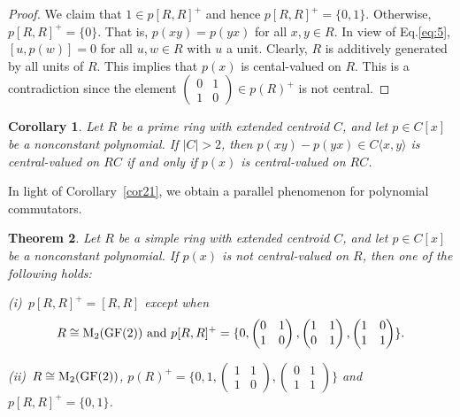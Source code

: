 \documentclass[11pt]{article}
\newtheorem{theorem}{Theorem}
\newtheorem{corollary}[theorem]{Corollary}
\theoremstyle{definition}
\begin{document}
{{{{\begin{proof}
We claim that $1\in p[R, R]^+$ and hence  $p[R, R]^+=\{0, 1\}.$
Otherwise, $p[R, R]^+=\{0\}$. That is, $p(xy)=p(yx)$ for all $x, y\in R$.
In view of Eq.\eqref{eq:5}, $[u, p(w)]=0$ for all $u, w\in R$ with $u$ a unit. Clearly, $R$ is additively generated by all units of $R$. This implies that $p(x)$ is cental-valued on $R$. This is a contradiction since the element $\begin{pmatrix}
						0& 1 \\
						1 & 0
					\end{pmatrix}\in p(R)^+$ is not central.
\end{proof}

\begin{corollary}\label{cor24}
Let $R$ be a prime ring with extended centroid $C$, and let $p \in C[x]$ be a nonconstant polynomial. If $|C|>2$, then
$p(xy)-p(yx)\in C\langle x, y \rangle$ is central-valued on $RC$ if and only if $p(x)$ is central-valued on $RC$.
\end{corollary}
				
				In light of Corollary~\ref{cor21}, we obtain a parallel phenomenon for polynomial commutators.
				
				\begin{theorem}\label{thm52}
Let $R$ be a simple ring with extended centroid $C$, and let $p \in C[x]$ be a nonconstant polynomial. If $p(x)$ is not central-valued on $R$, then one of the following holds:

(i)\ $p[R, R]^+=[R,R]$ except when
$$
R\cong {\rm M}_2({\rm GF}(2))\ \text{\rm and}\ p[R, R]^+=\{0, \begin{pmatrix}
						0 & 1 \\
						1 & 0
					\end{pmatrix}, \begin{pmatrix}
						1& 1 \\
						0 & 1
					\end{pmatrix},  \begin{pmatrix}
						1& 0 \\
						1 & 1
					\end{pmatrix}\}.
$$

(ii)\ $R\cong {\rm M}_2({\rm GF}(2))$,
$p(R)^+=\{0, 1, \begin{pmatrix}
						1 & 1 \\
						1 & 0
					\end{pmatrix}, \begin{pmatrix}
						0 & 1 \\
						1 & 1
					\end{pmatrix}\}$	
and $p[R, R]^+=\{0, 1\}$.
				\end{theorem}
				
}}}}
\end{document}
